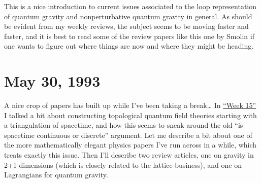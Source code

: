 \documentclass{article}
\def\tightlist{}
\renewcommand{\texttt}[1]{%
  \begingroup
  \ttfamily
  \begingroup\lccode`~=`/\lowercase{\endgroup\def~}{/\discretionary{}{}{}}%
  \begingroup\lccode`~=`[\lowercase{\endgroup\def~}{[\discretionary{}{}{}}%
  \begingroup\lccode`~=`.\lowercase{\endgroup\def~}{.\discretionary{}{}{}}%
  \catcode`/=\active\catcode`[=\active\catcode`.=\active
  \scantokens{#1\noexpand}%
  \endgroup
}
\begin{document}
This is a nice introduction to current issues associated to the loop
representation of quantum gravity and nonperturbative quantum gravity in
general. As should be evident from my weekly reviews, the subject seems
to be moving faster and faster, and it is best to read some of the
review papers like this one by Smolin if one wants to figure out where
things are now and where they might be heading.



\hypertarget{week16}{%
\section{May 30, 1993}\label{week16}}

A nice crop of papers has built up while I've been taking a
break\ldots{} In \protect\hyperlink{week15}{``Week 15''} I talked a bit
about constructing topological quantum field theories starting with a
triangulation of spacetime, and how this seems to sneak around the old
``is spacetime continuous or discrete'' argument. Let me describe a bit
about one of the more mathematically elegant physics papers I've run
across in a while, which treats exactly this issue. Then I'll describe
two review articles, one on gravity in 2+1 dimensions (which is closely
related to the lattice business), and one on Lagrangians for quantum
gravity.

\end{document}
